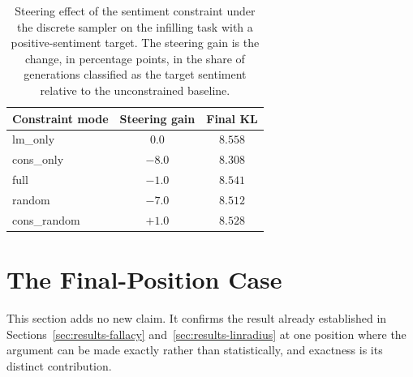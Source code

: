 \begin{table}[t]
    \centering
    \small
    \begin{tabular}{lcc}
        \toprule
        Constraint mode & Steering gain & Final KL \\
        \midrule
        lm\_only & $0.0$ & $8.558$ \\
        cons\_only & $-8.0$ & $8.308$ \\
        full & $-1.0$ & $8.541$ \\
        random & $-7.0$ & $8.512$ \\
        cons\_random & $+1.0$ & $8.528$ \\
        \bottomrule
    \end{tabular}
    \caption[Steering effect of the sentiment constraint, discrete sampler, infilling.]{Steering effect of the sentiment constraint under the discrete sampler on the infilling task with a positive-sentiment target. The steering gain is the change, in percentage points, in the share of generations classified as the target sentiment relative to the unconstrained baseline.}
    \label{tab:constrained}
\end{table}

\section{The Final-Position Case}
\label{sec:results-lasttoken}


This section adds no new claim. It confirms the result already established in Sections~\ref{sec:results-fallacy} and~\ref{sec:results-linradius} at one position where the argument can be made exactly rather than statistically, and exactness is its distinct contribution.

